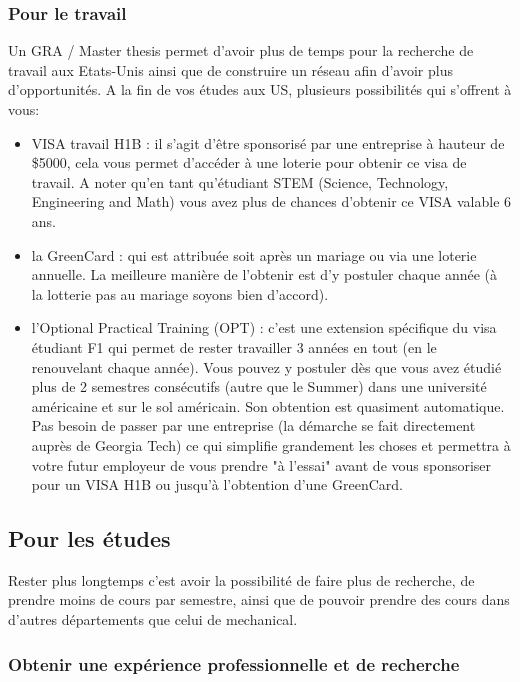 \documentclass{article}
\begin{document}
\subsubsection{Pour le travail}

Un GRA / Master thesis permet d'avoir plus de temps pour la recherche de travail aux Etats-Unis ainsi que de construire un réseau afin d'avoir plus d'opportunités. A la fin de vos études aux US, plusieurs possibilités qui s'offrent à vous:
\begin{itemize}
\item VISA travail H1B : il s'agit d'être sponsorisé par une entreprise à hauteur de \$5000, cela vous permet d'accéder à une loterie pour obtenir ce visa de travail. A noter qu'en tant qu'étudiant STEM (Science, Technology, Engineering and Math) vous avez plus de chances d'obtenir ce VISA valable 6 ans.
\item la GreenCard : qui est attribuée soit après un mariage ou via une loterie annuelle. La meilleure manière de l'obtenir est d'y postuler chaque année (à la lotterie pas au mariage soyons bien d'accord).
\item l'Optional Practical Training (OPT) :  c'est une extension spécifique du visa étudiant F1 qui permet de rester travailler 3 années en tout (en le renouvelant chaque année). Vous pouvez y postuler dès que vous avez étudié plus de 2 semestres consécutifs (autre que le Summer) dans une université américaine et sur le sol américain. Son obtention est quasiment automatique. Pas besoin de passer par une entreprise (la démarche se fait directement auprès de Georgia Tech) ce qui simplifie grandement les choses et permettra à votre futur employeur de vous prendre "à l'essai" avant de vous sponsoriser pour un VISA H1B ou jusqu'à l'obtention d'une GreenCard.
\end{itemize}

\subsection{Pour les études}


Rester plus longtemps c'est avoir la possibilité de faire plus de recherche, de prendre moins de cours par semestre, ainsi que de pouvoir prendre des cours dans d'autres départements que celui de mechanical. 

\subsubsection{Obtenir une expérience professionnelle et de recherche}
\end{document}
